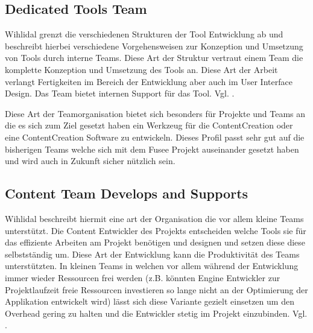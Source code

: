 \documentclass[pagesize, paper=a4, fontsize=12pt, titlepage=true, headings=small, headnosepline, abstractoff, liststotoc, nochapterprefix, plainheadsepline, twoside]{scrreprt}
\begin{document}
\subsection{Dedicated Tools Team}
Wihlidal grenzt die verschiedenen Strukturen der Tool Entwicklung ab und beschreibt hierbei verschiedene Vorgehensweisen zur Konzeption und Umsetzung von Tools durch interne Teams.
Diese Art der Struktur vertraut einem Team die komplette Konzeption und Umsetzung des Tools an. Diese Art der Arbeit verlangt Fertigkeiten im Bereich der Entwicklung aber auch im User Interface Design. Das Team bietet internen Support für das Tool. Vgl. \cite{Wihlidal2006}.

Diese Art der Teamorganisation bietet sich besonders für Projekte und Teams an die es sich zum Ziel gesetzt haben ein Werkzeug für die ContentCreation oder eine ContentCreation Software zu entwickeln. Dieses Profil passt sehr gut auf die bisherigen Teams welche sich mit dem Fusee Projekt auseinander gesetzt haben und wird auch in Zukunft sicher nützlich sein.

\subsection{Content Team Develops and Supports}
Wihlidal beschreibt hiermit eine art der Organisation die vor allem kleine Teams unterstützt. Die Content Entwickler des Projekts entscheiden welche Tools sie für das effiziente Arbeiten am Projekt benötigen und designen und setzen diese diese selbstständig um. Diese Art der Entwicklung kann die Produktivität des Teams unterstützten. In kleinen Teams in welchen vor allem während der Entwicklung immer wieder Ressourcen frei werden (z.B. könnten Engine Entwickler zur Projektlaufzeit freie Ressourcen investieren so lange nicht an der Optimierung der Applikation entwickelt wird) lässt sich diese Variante gezielt einsetzen um den Overhead gering zu halten und die Entwickler stetig im Projekt einzubinden. Vgl. \cite{Wihlidal2006}.
\end{document}
